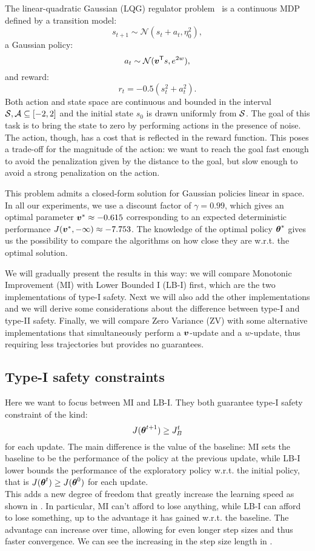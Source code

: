 The linear-quadratic Gaussian (LQG) regulator problem~\cite{peters} is a continuous MDP defined by a transition model:
\[
s_{t+1}\sim \mathcal{N}(s_t + a_t, \eta_0^2),
\]
a Gaussian policy:
\[
a_t \sim \mathcal{N}({\boldsymbol{v}}^{\mathsf{T}}s, e^{2w}),
\]
and reward:
\[
r_t = -0.5(s_t^2 + a_t^2).
\]
Both action and state space are continuous and bounded in the interval $\mathcal{S}, \mathcal{A} \subseteq [-2, 2]$ and the initial state $s_0$ is drawn uniformly from $\mathcal{S}$. The goal of this task is to bring the state to zero by performing actions in the presence of noise. The action, though, has a cost that is reflected in the reward function. This poses a trade-off for the magnitude of the action: we want to reach the goal fast enough to avoid the penalization given by the distance to the goal, but slow enough to avoid a strong penalization on the action. 

This problem admits a closed-form solution for Gaussian policies linear in space. In all our experiments, we use a discount factor of $\gamma=0.99$, which gives an optimal parameter $\boldsymbol{v}^* \approx -0.615$ corresponding to an expected deterministic performance $J(\boldsymbol{v}^*, -\infty)\approx-7.753$. 
The knowledge of the optimal policy ${\boldsymbol{\theta}}^*$ gives us the possibility to compare the algorithms on how close they are w.r.t. the optimal solution.

We will gradually present the results in this way: we will compare Monotonic Improvement (MI) with Lower Bounded I (LB-I) first, which are the two implementations of type-I safety. Next we will also add the other implementations and we will derive some considerations about the difference between type-I and type-II safety. Finally, we will compare Zero Variance (ZV) with some alternative implementations that simultaneously perform a $\boldsymbol{v}$-update and a $w$-update, thus requiring less trajectories but provides no guarantees.

\subsection{Type-I safety constraints}

Here we want to focus between MI and LB-I. They both guarantee type-I safety constraint of the kind:
\[
J({\boldsymbol{\theta}}^{t+1}) \geq {J_{B}^{t}}
\]
for each update. The main difference is the value of the baseline: MI sets the baseline to be the performance of the policy at the previous update, while LB-I lower bounds the performance of the exploratory policy w.r.t. the initial policy, that is $J({\boldsymbol{\theta}}^t)\geq J({\boldsymbol{\theta}}^0)$ for each update.\\
This adds a new degree of freedom that greatly increase the learning speed as shown in . In particular, MI can't afford to lose anything, while LB-I can afford to lose something, up to the advantage it has gained w.r.t. the baseline. The advantage can increase over time, allowing for even longer step sizes and thus faster convergence. We can see the increasing in the step size length in .

